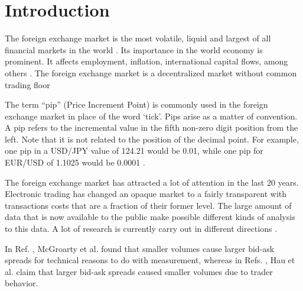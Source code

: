 \section{Introduction}\label{sec:introduction}

The foreign exchange market is the most volatile, liquid and largest of all
financial markets in the world
\cite{forex_liquidity,info_forex,forex_market_micro,intraday_forex}. Its
importance in the world economy is prominent. It affects employment, inflation,
international capital flows, among others \cite{forex_structure}. The foreign
exchange market is a decentralized market without common trading floor
\cite{teach_spread,forex_structure,info_forex,forex_market_micro}

The term ``pip'' (Price Increment Point) is commonly used in the foreign
exchange market in place of the word ‘tick’. Pips arise as a matter of
convention. A pip refers to the incremental value in the fifth non-zero digit
position from the left. Note that it is not related to the position of the
decimal point. For example, one pip in a USD/JPY value of 124.21 would be 0.01,
while one pip for EUR/USD of 1.1025 would be 0.0001
\cite{order_flow_forex,forex_structure,micro_eff,forex_market_micro}.

The foreign exchange market has attracted a lot of attention in the last 20
years. Electronic trading has changed an opaque market to a fairly transparent
with transactions costs that are a fraction of their former level. The large
amount of data that is now available to the public make possible different
kinds of analysis to this data. A lot of research is currently carry out in
different directions
\cite{curr_speculation,forex_algorithmic,teach_spread,electronic_forex,forex_microstructure,patterns_forex,eur_change_forex,spread_competition,forex_structure,political_forex,forex_liquidity,forex_volatility,info_forex,local_forex,intraday_forex,forex_inefficiency}.

In Ref. \cite{micro_eff}, McGroarty et al. found that smaller volumes cause
larger bid-ask spreads for technical reasons to do with measurement, whereas in
Refs. \cite{eur_int_curr,eur_change_forex}, Hau et al. claim that larger
bid-ask spreads caused smaller volumes due to trader behavior.


